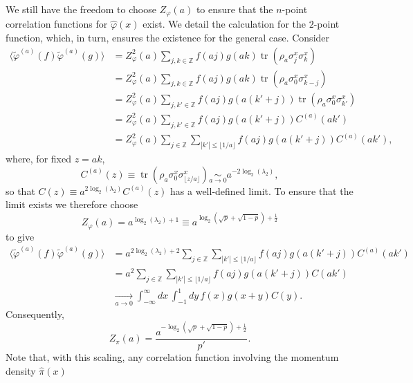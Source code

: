 \documentclass[prl,twocolumn,lengthcheck,superscriptaddress]{revtex4-1}
\newcommand{\tr}{\operatorname{tr}}
\theoremstyle{definition}
\theoremstyle{remark}
\begin{document}
We still have the freedom to choose $Z_{\varphi}(a)$ to ensure that the $n$-point correlation functions for $\widehat{\varphi}(x)$ exist. We detail the calculation for the $2$-point function, which, in turn, ensures the existence for the general case. Consider
\begin{equation}
	\begin{split}
	\langle \widetilde{\varphi}^{(a)}(f)\widetilde{\varphi}^{(a)}(g)\rangle &= Z_{\varphi}^2(a)\sum_{j,k\in \mathbb{Z}} f(aj)g(ak) \tr(\rho_{a}\sigma^x_{j}\sigma^x_{k}) \\
	 &= Z_{\varphi}^2(a)\sum_{j,k\in \mathbb{Z}} f(aj)g(ak) \tr(\rho_{a}\sigma^x_{0}\sigma^x_{k-j}) \\
	 &= Z_{\varphi}^2(a)\sum_{j,k'\in \mathbb{Z}} f(aj)g(a(k'+j)) \tr(\rho_{a}\sigma^x_{0}\sigma^x_{k'}) \\
	 &= Z_{\varphi}^2(a)\sum_{j,k'\in \mathbb{Z}} f(aj)g(a(k'+j)) C^{(a)}(ak') \\
	 &= Z_{\varphi}^2(a)\sum_{j\in \mathbb{Z}}\sum_{|k'| \le \lfloor 1/a \rfloor} f(aj)g(a(k'+j)) C^{(a)}(ak'),
	\end{split}
\end{equation}
where, for fixed $z=ak$,
\begin{equation}
	C^{(a)}(z) \equiv \tr(\rho_{a}\sigma^x_{0}\sigma^x_{\lfloor z/a\rfloor}) \underset{a\rightarrow 0}{\sim} a^{-2\log_2(\lambda_2)},
\end{equation}
so that $C(z) \equiv a^{2\log_2(\lambda_2)}C^{(a)}(z)$ has a well-defined limit.
To ensure that the limit exists we therefore choose
\begin{equation}
	Z_{\varphi}(a) = a^{\log_2(\lambda_2)+1} \equiv a^{\log_2(\sqrt{p}+\sqrt{1-p}) + \frac12}
\end{equation}
to give
\begin{equation}
	\begin{split}
	\langle \widetilde{\varphi}^{(a)}(f)\widetilde{\varphi}^{(a)}(g)\rangle &= a^{2\log_2(\lambda_2)+2}\sum_{j\in \mathbb{Z}}\sum_{|k'| \le \lfloor 1/a \rfloor} f(aj)g(a(k'+j)) C^{(a)}(ak') \\
	&= a^{2}\sum_{j\in \mathbb{Z}}\sum_{|k'| \le \lfloor 1/a \rfloor} f(aj)g(a(k'+j)) C(ak') 	\\
	&\underset{a\rightarrow 0}{\longrightarrow} \int_{-\infty}^{\infty} dx\, \int_{-1}^{1} dy\,  f(x)g(x+y) C(y).
	\end{split}
\end{equation}
Consequently,
\begin{equation}
	Z_\pi(a) = \frac{a^{-\log_2(\sqrt{p}+\sqrt{1-p}) + \frac12}}{p'}.
\end{equation}
Note that, with this scaling, any correlation function involving the momentum density $\widehat{\pi}(x)$ 
\end{document}
